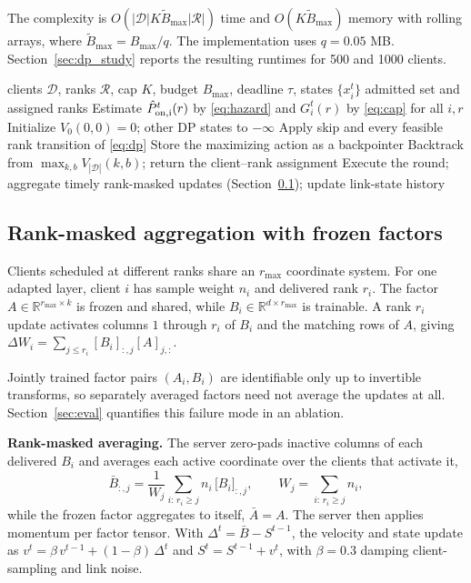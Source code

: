 \documentclass[preprint,12pt]{elsarticle}
\begin{document}
The complexity is $O(|\mathcal D|K\widetilde B_{\max}|\mathcal R|)$ time and $O(K\widetilde B_{\max})$ memory with rolling arrays, where $\widetilde B_{\max}=B_{\max}/q$. The implementation uses $q=0.05$ MB. Section~\ref{sec:dp_study} reports the resulting runtimes for 500 and 1000 clients.

\begin{algorithm}[t]
\caption{FedRAS scheduling round}
\label{alg:scheduler}
\begin{algorithmic}[1]
\REQUIRE clients $\mathcal D$, ranks $\mathcal R$, cap $K$, budget $B_{\max}$, deadline $\tau$, states $\{x_i^t\}$
\ENSURE admitted set and assigned ranks
\STATE Estimate $\hat P_{\rm on,i}^t(r)$ by \eqref{eq:hazard} and $G_i^t(r)$ by \eqref{eq:cap} for all $i,r$
\STATE Initialize $V_0(0,0)=0$; other DP states to $-\infty$
    \STATE Apply skip and every feasible rank transition of \eqref{eq:dp}
    \STATE Store the maximizing action as a backpointer
  \ENDFOR
\ENDFOR
\STATE Backtrack from $\max_{k,b} V_{|\mathcal D|}(k,b)$; return the client--rank assignment
\STATE Execute the round; aggregate timely rank-masked updates (Section~\ref{sec:aggregation}); update link-state history
\end{algorithmic}
\end{algorithm}

\subsection{Rank-masked aggregation with frozen factors}
\label{sec:aggregation}
Clients scheduled at different ranks share an $r_{\max}$ coordinate system. For one adapted layer, client $i$ has sample weight $n_i$ and delivered rank $r_i$. The factor $A\in\mathbb R^{r_{\max}\times k}$ is frozen and shared, while $B_i\in\mathbb R^{d\times r_{\max}}$ is trainable. A rank $r_i$ update activates columns $1$ through $r_i$ of $B_i$ and the matching rows of $A$, giving $\Delta W_i=\sum_{j\le r_i}[B_i]_{:,j}[A]_{j,:}$.

Jointly trained factor pairs $(A_i,B_i)$ are identifiable only up to invertible transforms, so separately averaged factors need not average the updates at all. Section~\ref{sec:eval} quantifies this failure mode in an ablation.

\textbf{Rank-masked averaging.} The server zero-pads inactive columns of each delivered $B_i$ and averages each active coordinate over the clients that activate it,
\begin{equation}
\bar B_{:,j}=\frac{1}{W_j}\sum_{i:\,r_i\ge j} n_i\,\big[B_i\big]_{:,j},
\qquad
W_j=\sum_{i:\,r_i\ge j} n_i ,
\label{eq:maskavg}
\end{equation}
while the frozen factor aggregates to itself, $\bar A=A$. The server then applies momentum per factor tensor. With $\Delta^t=\bar B-S^{t-1}$, the velocity and state update as $v^t=\beta\,v^{t-1}+(1-\beta)\,\Delta^t$ and $S^t=S^{t-1}+v^t$, with $\beta=0.3$ damping client-sampling and link noise.
\end{document}
